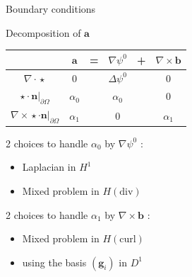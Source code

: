 \documentclass{beamer}
\newcommand{\grad}{{\nabla}}
\newcommand{\laplace}{{\Delta}}
\newcommand{\curl}{{\nabla\times}}
\renewcommand{\div}{{\nabla\cdot}}
\newcommand{\restr}{{\big\rvert_{\partial\Omega}}}
\newcommand{\tailleg}{0.7}
\begin{document}
\begin{frame}
\begin{columns}[onlytextwidth]
\begin{column}{0.65\textwidth}
    \end{column}
  \end{columns}
\end{frame}

\begin{frame}{Boundary conditions}
  \label{psi0}
  \begin{block}{Decomposition of $\mathbf{a}$}
    \begin{center}
      \begin{tabular}{c|ccccc}
        & $\mathbf{a}$ & = & $\grad\psi^0$ & + & $\curl \mathbf{b}$ \\ \hline
        $\div\star$ & 0 & & $\laplace\psi^0$ & & 0\\ \hline
        $\star\cdot \mathbf{n}\restr$ & $\alpha_0$ & & $\alpha_0$ & & 0\\ \hline
        $\curl\star\cdot \mathbf{n}\restr$ & $\alpha_1$ & & 0 & & $\alpha_1$
      \end{tabular}
    \end{center}
  \end{block}
  2 choices to handle $\alpha_0$ by $\grad\psi^0$ :
  \begin{itemize}
  \item Laplacian in $H^1$
  \item Mixed problem in $H(\mathrm{div})$
  \end{itemize}
  2 choices to handle $\alpha_1$ by $\curl\mathbf{b}$ :
  \begin{itemize}
  \item Mixed problem in $H(\mathrm{curl})$
  \item using the basis $(\mathbf{g}_i)$ in $D^1$
  \end{itemize}
\end{frame}
\end{document}
